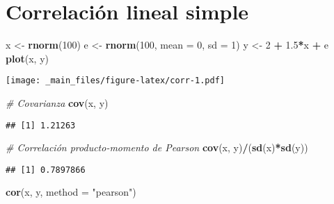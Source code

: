 \documentclass[
]{book}
\newenvironment{Shaded}{\begin{snugshade}}{\end{snugshade}}
\newcommand{\CommentTok}[1]{\textcolor[rgb]{0.56,0.35,0.01}{\textit{#1}}}
\newcommand{\DataTypeTok}[1]{\textcolor[rgb]{0.13,0.29,0.53}{#1}}
\newcommand{\DecValTok}[1]{\textcolor[rgb]{0.00,0.00,0.81}{#1}}
\newcommand{\FloatTok}[1]{\textcolor[rgb]{0.00,0.00,0.81}{#1}}
\newcommand{\KeywordTok}[1]{\textcolor[rgb]{0.13,0.29,0.53}{\textbf{#1}}}
\newcommand{\NormalTok}[1]{#1}
\newcommand{\OperatorTok}[1]{\textcolor[rgb]{0.81,0.36,0.00}{\textbf{#1}}}
\newcommand{\StringTok}[1]{\textcolor[rgb]{0.31,0.60,0.02}{#1}}
\begin{document}
\hypertarget{correlaciuxf3n-lineal-simple}{%
\section{Correlación lineal simple}\label{correlaciuxf3n-lineal-simple}}

\begin{Shaded}
\begin{Highlighting}[]
\NormalTok{x <-}\StringTok{ }\KeywordTok{rnorm}\NormalTok{(}\DecValTok{100}\NormalTok{)}
\NormalTok{e <-}\StringTok{ }\KeywordTok{rnorm}\NormalTok{(}\DecValTok{100}\NormalTok{, }\DataTypeTok{mean =} \DecValTok{0}\NormalTok{, }\DataTypeTok{sd =} \DecValTok{1}\NormalTok{)}
\NormalTok{y <-}\StringTok{ }\DecValTok{2} \OperatorTok{+}\StringTok{ }\FloatTok{1.5}\OperatorTok{*}\NormalTok{x }\OperatorTok{+}\StringTok{ }\NormalTok{e}
\KeywordTok{plot}\NormalTok{(x, y)}
\end{Highlighting}
\end{Shaded}

\texttt{[image: \_main\_files/figure-latex/corr-1.pdf]}

\begin{Shaded}
\begin{Highlighting}[]
\CommentTok{# Covarianza}
\KeywordTok{cov}\NormalTok{(x, y)}
\end{Highlighting}
\end{Shaded}

\begin{verbatim}
## [1] 1.21263
\end{verbatim}

\begin{Shaded}
\begin{Highlighting}[]
\CommentTok{# Correlación producto-momento de Pearson}
\KeywordTok{cov}\NormalTok{(x, y)}\OperatorTok{/}\NormalTok{(}\KeywordTok{sd}\NormalTok{(x)}\OperatorTok{*}\KeywordTok{sd}\NormalTok{(y))}
\end{Highlighting}
\end{Shaded}

\begin{verbatim}
## [1] 0.7897866
\end{verbatim}

\begin{Shaded}
\begin{Highlighting}[]
\KeywordTok{cor}\NormalTok{(x, y, }\DataTypeTok{method =} \StringTok{"pearson"}\NormalTok{)}
\end{Highlighting}
\end{Shaded}
\end{document}
